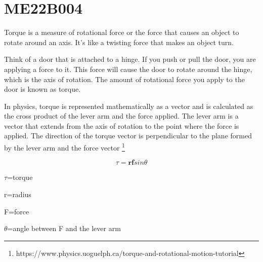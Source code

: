 \section{ME22B004}
  Torque is a measure of rotational force or the force that causes an object to rotate around an axis. It's like a twisting force that makes an object turn.

  Think of a door that is attached to a hinge. If you push or pull the door, you are applying a force to it. This force will cause the door to rotate around the hinge, which is the axis of rotation. The amount of rotational force you apply to the door is known as torque.

  In physics, torque is represented mathematically as a vector and is calculated as the cross product of the lever arm and the force applied. The lever arm is a vector that extends from the axis of rotation to the point where the force is applied. The direction of the torque vector is perpendicular to the plane formed by the lever arm and the force vector
  \footnote{https://www.physics.uoguelph.ca/torque-and-rotational-motion-tutorial}
  
{$$ \textbf{$\tau$}= \textbf{rf}sin \theta$$}

$\tau$=torque

r=radius

F=force

$\theta$=angle between F and the lever arm


